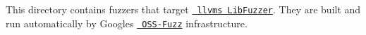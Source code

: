 This directory contains fuzzers that target \href{https://llvm.org/docs/LibFuzzer.html}{\texttt{ llvm\textquotesingle{}s Lib\+Fuzzer}}. They are built and run automatically by Google\textquotesingle{}s \href{https://github.com/google/oss-fuzz/}{\texttt{ OSS-\/\+Fuzz}} infrastructure. 